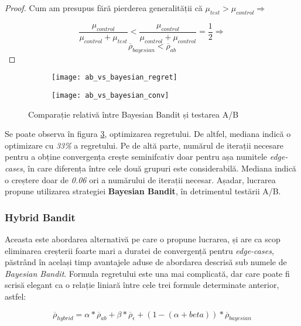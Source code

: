 \begin{proof}
Cum am presupus fără pierderea generalității că $\mu_{test} > \mu_{control} \Rightarrow$

\[
\frac{\mu_{control}}{\mu_{control} + \mu_{test}} < \frac{\mu_{control}}{\mu_{control} + \mu_{control}} = \frac{1}{2} \Rightarrow
\]
\[
\overline{\rho}_{bayesian} < \overline{\rho}_{ab}
\]
\end{proof}


\begin{figure}[H]
	\centering
	\begin{subfigure}{.5\textwidth}
		\centering
		\texttt{[image: ab\_vs\_bayesian\_regret]}
		\label{fig:sub1}
	\end{subfigure}%
	\begin{subfigure}{.5\textwidth}
		\centering
		\texttt{[image: ab\_vs\_bayesian\_conv]}
		\label{fig:sub2}
	\end{subfigure}
	\caption{Comparație relativă între Bayesian Bandit și testarea A/B}
	\label{fig:ab_vs_bayesian}
\end{figure}

Se poate observa în figura \ref{fig:ab_vs_bayesian}, optimizarea regretului. De altfel, mediana indică o optimizare cu \textit{33\%} a regretului. Pe de altă parte, numărul de iterații necesare pentru a obține convergența crește seminifcativ doar pentru așa numitele \textit{edge-cases}, în care diferența între cele două grupuri este considerabilă. Mediana indică o creștere doar de \textit{0.06} ori a numărului de iterații necesar. Așadar, lucrarea propune utilizarea strategiei \textbf{Bayesian Bandit}, în detrimentul testării A/B.

\subsubsection{Hybrid Bandit}

Aceasta este abordarea alternativă pe care o propune lucrarea, și are ca scop eliminarea creșterii foarte mari a duratei de convergență pentru \textit{edge-cases}, păstrând în același timp avantajele aduse de abordarea descrisă sub numele de \textit{Bayesian Bandit}. Formula regretului este una mai complicată, dar care poate fi scrisă elegant ca o relație liniară între cele trei formule determinate anterior, astfel:

\[
\overline{\rho}_{hybrid} = \alpha * \overline{\rho}_{ab}  + \beta * \overline{\rho}_{\epsilon} + (1 - (\alpha + beta)) * \overline{\rho}_{bayesian} 
\]

